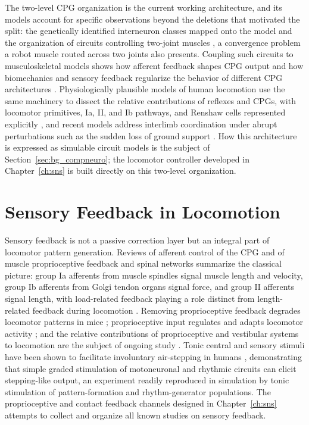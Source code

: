 The two-level CPG organization is the current working architecture, and its models account for specific observations beyond the deletions that motivated the split: the genetically identified interneuron classes mapped onto the model \citep{rybak_organization_2015} and the organization of circuits controlling two-joint muscles \citep{shevtsova_modeling_2016}, a convergence problem a robot muscle routed across two joints also presents. Coupling such circuits to musculoskeletal models shows how afferent feedback shapes CPG output \citep{markin_afferent_2010} and how biomechanics and sensory feedback regularize the behavior of different CPG architectures \citep{deng_biomechanical_2022}. Physiologically plausible models of human locomotion use the same machinery to dissect the relative contributions of reflexes and CPGs, with locomotor primitives, Ia, II, and Ib pathways, and Renshaw cells represented explicitly \citep{dirusso_investigating_2023}, and recent models address interlimb coordination under abrupt perturbations such as the sudden loss of ground support \citep{shinohara_mechanisms_2025}. How this architecture is expressed as simulable circuit models is the subject of Section~\ref{sec:bg_compneuro}; the locomotor controller developed in Chapter~\ref{ch:sns} is built directly on this two-level organization.


\section{Sensory Feedback in Locomotion}\label{sec:bg_sensory}

Sensory feedback is not a passive correction layer but an integral part of locomotor pattern generation. Reviews of afferent control of the CPG \citep{van_de_crommert_review_1998} and of muscle proprioceptive feedback and spinal networks \citep{windhorst_muscle_2007, windhorst_spinal_2022} summarize the classical picture: group Ia afferents from muscle spindles signal muscle length and velocity, group Ib afferents from Golgi tendon organs signal force, and group II afferents signal length, with load-related feedback playing a role distinct from length-related feedback during locomotion \citep{dietz_significance_2000}. Removing proprioceptive feedback degrades locomotor patterns in mice \citep{akay_degradation_2014}; proprioceptive input regulates and adapts locomotor activity \citep{lam_role_2002}; and the relative contributions of proprioceptive and vestibular systems to locomotion are the subject of ongoing study \citep{akay_relative_2021, akay_sensory_2020}. Tonic central and sensory stimuli have been shown to facilitate involuntary air-stepping in humans \citep{selionov_tonic_2009}, demonstrating that simple graded stimulation of motoneuronal and rhythmic circuits can elicit stepping-like output, an experiment readily reproduced in simulation by tonic stimulation of pattern-formation and rhythm-generator populations. The proprioceptive and contact feedback channels designed in Chapter~\ref{ch:sns} attempts to collect and organize all known studies on sensory feedback.

